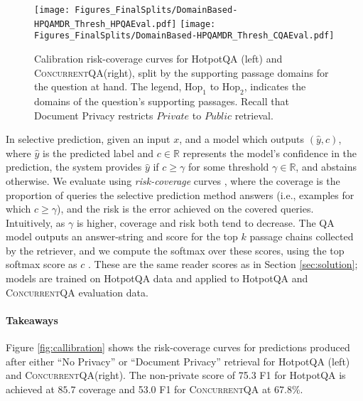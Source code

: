 \documentclass{article}
\renewcommand\cite{\citep}	\newcommand\shortcite{\citeyearpar}\newcommand\newcite{\citet}
\newcommand{\datasetname}{\textsc{ConcurrentQA}\xspace}
\begin{document}
\begin{figure}
    \centering
    \texttt{[image: Figures\_FinalSplits/DomainBased-HPQAMDR\_Thresh\_HPQAEval.pdf]}
    \texttt{[image: Figures\_FinalSplits/DomainBased-HPQAMDR\_Thresh\_CQAEval.pdf]}
    \caption[width=0.9\linewidth]{Calibration risk-coverage curves for HotpotQA (left) and \datasetname (right), split by the supporting passage domains for the question at hand. The legend, $\mathrm{Hop_1}$ to $\mathrm{Hop_2}$, indicates the domains of the question's supporting passages. Recall that Document Privacy restricts $Private$ to $Public$ retrieval.} 
    \label{fig:callibration_by_domain}
\end{figure}


In selective prediction, given an input $x$, and a model which outputs $(\hat{y}, c)$, where $\hat{y}$ is the predicted label and $c \in \mathbb{R}$ represents the model's confidence in the prediction, the system provides $\hat{y}$ if $c \geq \gamma$ for some threshold $\gamma \in \mathbb{R}$, and abstains otherwise. 
We evaluate using \textit{risk-coverage} curves \cite{elyaniv2010selectivepred}, where the coverage is the proportion of queries the selective prediction method answers (i.e., examples for which $c \geq \gamma$), and the risk is the error achieved on the covered queries. Intuitively, as $\gamma$ is higher, coverage and risk both tend to decrease. The QA model outputs an answer-string and score for the top $k$ passage chains collected by the retriever, and we compute the softmax over these scores, using the top softmax score as $c$ \cite{hendrycks2017maxprob}.
These are the same reader scores as in Section \ref{sec:solution}; models are trained on HotpotQA data and applied to HotpotQA and \datasetname evaluation data.


\paragraph{Takeaways} 
Figure \ref{fig:callibration} shows the risk-coverage curves for predictions produced after either ``No Privacy'' or ``Document Privacy'' retrieval for HotpotQA (left) and \datasetname (right). The non-private score of 75.3 F1 for HotpotQA is achieved at $85.7$ coverage and 53.0 F1 for \datasetname at $67.8\%$. 
\end{document}
